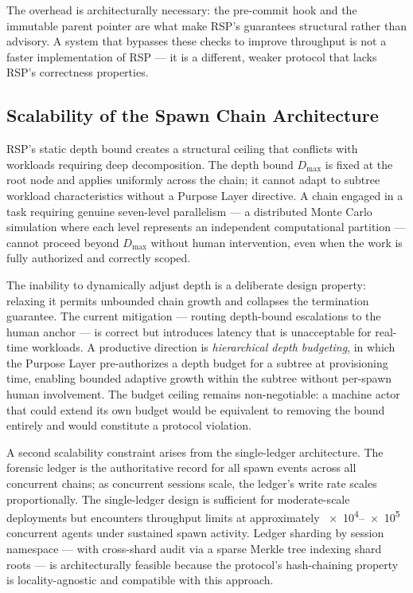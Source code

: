The overhead is architecturally necessary: the pre-commit hook and the immutable parent pointer are what make RSP's guarantees structural rather than advisory. A system that bypasses these checks to improve throughput is not a faster implementation of RSP — it is a different, weaker protocol that lacks RSP's correctness properties.

\subsection{Scalability of the Spawn Chain Architecture}
\label{sec:rs-scalability}

RSP's static depth bound creates a structural ceiling that conflicts with workloads requiring deep decomposition. The depth bound $D_{\max}$ is fixed at the root node and applies uniformly across the chain; it cannot adapt to subtree workload characteristics without a Purpose Layer directive. A chain engaged in a task requiring genuine seven-level parallelism — a distributed Monte Carlo simulation where each level represents an independent computational partition — cannot proceed beyond $D_{\max}$ without human intervention, even when the work is fully authorized and correctly scoped.

The inability to dynamically adjust depth is a deliberate design property: relaxing it permits unbounded chain growth and collapses the termination guarantee. The current mitigation — routing depth-bound escalations to the human anchor — is correct but introduces latency that is unacceptable for real-time workloads. A productive direction is \emph{hierarchical depth budgeting}, in which the Purpose Layer pre-authorizes a depth budget for a subtree at provisioning time, enabling bounded adaptive growth within the subtree without per-spawn human involvement. The budget ceiling remains non-negotiable: a machine actor that could extend its own budget would be equivalent to removing the bound entirely and would constitute a protocol violation.

A second scalability constraint arises from the single-ledger architecture. The forensic ledger is the authoritative record for all spawn events across all concurrent chains; as concurrent sessions scale, the ledger's write rate scales proportionally. The single-ledger design is sufficient for moderate-scale deployments but encounters throughput limits at approximately \numrange{e4}{e5} concurrent agents under sustained spawn activity. Ledger sharding by session namespace — with cross-shard audit via a sparse Merkle tree indexing shard roots — is architecturally feasible because the protocol's hash-chaining property is locality-agnostic and compatible with this approach.

